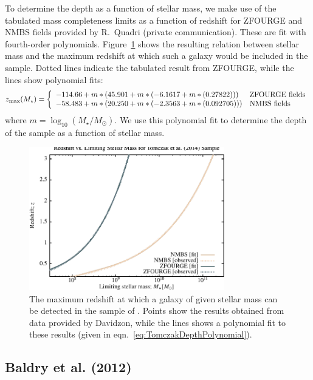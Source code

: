 To determine the depth as a function of stellar mass, we make use of the tabulated mass completeness limits as a function of redshift for ZFOURGE and NMBS fields provided by R.~Quadri (private communication). These are fit with fourth-order polynomials. Figure~\ref{fig:Tomczak2014DepthFit} shows the resulting relation between stellar mass and the maximum redshift at which such a galaxy would be included in the sample. Dotted lines indicate the tabulated result from ZFOURGE, while the lines show polynomial fits:
\begin{equation}
 z_{\rm max}(M_\star) = \left\{ \begin{array}{ll} -114.66+m*(45.901+m*(-6.1617+m*(0.27822))) & \hbox{ZFOURGE fields} \\ -58.483+m*(20.250+m*(-2.3563+m*(0.092705))) & \hbox{NMBS fields} \end{array} \right.
 \label{eq:TomczakDepthPolynomial}
\end{equation}
where $m= \log_{10}(M_\star/M_\odot)$. We use this polynomial fit to determine the depth of the sample as a function of stellar mass.

\begin{figure}
 \begin{center}
 \includegraphics[width=85mm,trim=0mm 0mm 0mm 4mm,clip]{Plots/DataAnalysis/TomczakZFOURGEMassRedshiftRelation.pdf}
 \end{center}
 \caption{The maximum redshift at which a galaxy of given stellar mass can be detected in the sample of \protect\cite{tomczak_galaxy_2014}. Points show the results obtained from data provided by Davidzon, while the lines shows a polynomial fit to these results (given in eqn.~\ref{eq:TomczakDepthPolynomial}).}
 \label{fig:Tomczak2014DepthFit}
\end{figure}

\subsection{Baldry et al. (2012)}\label{phys:surveyGeometry:surveyGeometryBaldry2012GAMA}

